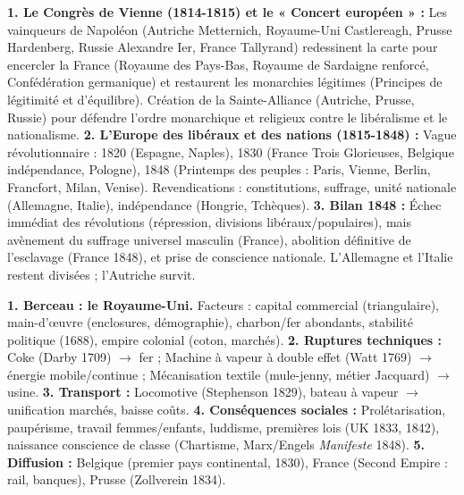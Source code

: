 \documentclass[11pt]{article}
\newcommand{\cle}[1]{{\popxbold\color{popdark}#1}}
\begin{document}
\begin{aretenir}
\textbf{1. Le Congrès de Vienne (1814-1815) et le « Concert européen » :} Les vainqueurs de Napoléon (Autriche \cle{Metternich}, Royaume-Uni \cle{Castlereagh}, Prusse \cle{Hardenberg}, Russie \cle{Alexandre Ier}, France \cle{Tallyrand}) redessinent la carte pour encercler la France (Royaume des Pays-Bas, Royaume de Sardaigne renforcé, Confédération germanique) et restaurent les monarchies légitimes (\cle{Principes de légitimité} et d'\cle{équilibre}). Création de la \cle{Sainte-Alliance} (Autriche, Prusse, Russie) pour défendre l'ordre monarchique et religieux contre le libéralisme et le nationalisme.
\textbf{2. L'Europe des libéraux et des nations (1815-1848) :} Vague révolutionnaire : 1820 (Espagne, Naples), 1830 (France \cle{Trois Glorieuses}, Belgique indépendance, Pologne), 1848 (\cle{Printemps des peuples} : Paris, Vienne, Berlin, Francfort, Milan, Venise). Revendications : constitutions, suffrage, unité nationale (Allemagne, Italie), indépendance (Hongrie, Tchèques).
\textbf{3. Bilan 1848 :} Échec immédiat des révolutions (répression, divisions libéraux/populaires), mais avènement du suffrage universel masculin (France), abolition définitive de l'esclavage (France 1848), et prise de conscience nationale. L'Allemagne et l'Italie restent divisées ; l'Autriche survit.
\end{aretenir}

\begin{aretenir}
\textbf{1. Berceau : le Royaume-Uni.} Facteurs : capital commercial (triangulaire), main-d'œuvre (enclosures, démographie), charbon/fer abondants, stabilité politique (1688), empire colonial (coton, marchés).
\textbf{2. Ruptures techniques :} \cle{Coke} (Darby 1709) $\rightarrow$ fer ; \cle{Machine à vapeur} à double effet (Watt 1769) $\rightarrow$ énergie mobile/continue ; \cle{Mécanisation textile} (mule-jenny, métier Jacquard) $\rightarrow$ usine.
\textbf{3. Transport :} Locomotive (Stephenson 1829), bateau à vapeur $\rightarrow$ unification marchés, baisse coûts.
\textbf{4. Conséquences sociales :} \cle{Prolétarisation}, paupérisme, travail femmes/enfants, luddisme, premières lois (UK 1833, 1842), naissance conscience de classe (Chartisme, Marx/Engels \emph{Manifeste} 1848).
\textbf{5. Diffusion :} Belgique (premier pays continental, 1830), France (Second Empire : rail, banques), Prusse (Zollverein 1834).
\end{aretenir}
\end{document}
